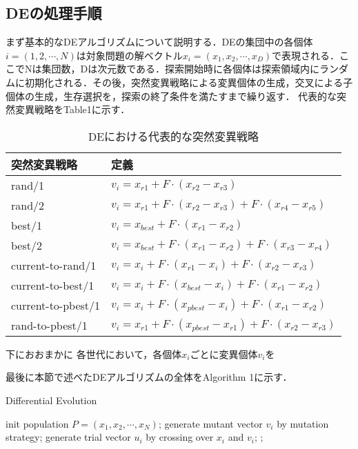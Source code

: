 \documentclass[a4paper,11pt,oneside,openany]{jsbook}
\begin{document}
\subsection{DEの処理手順}
まず基本的なDEアルゴリズムについて説明する．DEの集団中の各個体${i} = (1, 2, \cdots, N)$は対象問題の解ベクトル${x_i} = (x_1, x_2, \cdots, x_D)$で表現される．ここでNは集団数，Dは次元数である．探索開始時に各個体は探索領域内にランダムに初期化される．その後，突然変異戦略による変異個体の生成，交叉による子個体の生成，生存選択を，探索の終了条件を満たすまで繰り返す．
代表的な突然変異戦略をTable1に示す．
\begin{table}[htb]
  \begin{center}
    \begin{tabular}{ll} \hline
      突然変異戦略　& 定義  \\ \hline
      rand/1 & $v_{i} = x_{r1} + F\cdot(x_{r2} - x_{r3})$ \\
      rand/2 & $v_{i} = x_{r1} + F\cdot(x_{r2} - x_{r3}) + F\cdot(x_{r4} - x_{r5})$ \\
      best/1 & $v_{i} = x_{best} + F\cdot(x_{r1} - x_{r2})$ \\
      best/2 & $v_{i} = x_{best} + F\cdot(x_{r1} - x_{r2}) + F\cdot(x_{r3} - x_{r4})$ \\
      current-to-rand/1 & $v_{i} = x_{i} + F\cdot(x_{r1} - x_{i}) + F\cdot(x_{r2} - x_{r3})$ \\
      current-to-best/1 & $v_{i} = x_{i} + F\cdot(x_{best} - x_{i}) + F\cdot(x_{r1} - x_{r2})$ \\
      current-to-pbest/1 & $v_{i} = x_{i} + F\cdot(x_{pbest} - x_{i}) + F\cdot(x_{r1} - x_{r2})$ \\
      rand-to-pbest/1 & $v_{i} = x_{r1} + F\cdot(x_{pbest} - x_{r1}) + F\cdot(x_{r2} - x_{r3})$ \\ \hline
    \end{tabular}
    \caption{DEにおける代表的な突然変異戦略}
  \end{center}
\end{table}
下におおまかに
各世代において，各個体${x_i}$ごとに変異個体${v_i}$を

最後に本節で述べたDEアルゴリズムの全体をAlgorithm 1に示す．
\begin{algorithm}                      
\caption{Differential Evolution}         
\label{alg:pbnf}                          
\begin{algorithmic}  
\STATE init population ${P} = (x_1, x_2, \cdots, x_N)$;
        \STATE generate mutant vector {$v_i$} by mutation strategy;
        \STATE generate trial vector {$u_i$} by crossing over {$x_i$} and {$v_i$}; 
    \ENDFOR
            ;
        \ENDIF
    \ENDFOR
\ENDWHILE
\end{algorithmic}
\end{algorithm}　　　　　　　　　　　　　　　　　　　　　
\end{document}
